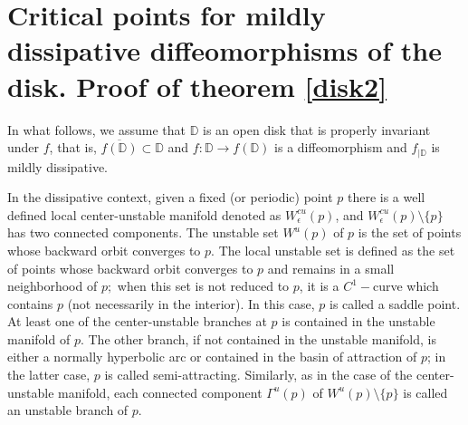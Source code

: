 \documentclass[a4paper,11pt]{article}
\newtheorem{proposition}[lemma]{Proposition}
\theoremstyle{definition}
\def\DD{{\mathbb D}}
\def\NN{{\mathbb N}}
\def\e{\epsilon}
\def\Ga{\Gamma}
\def\Ga{\Gamma}
\begin{document}









\section{Critical points for  mildly dissipative diffeomorphisms of the disk. Proof of theorem \ref{disk2}}\label{sec:disk}



In what follows, we assume that $\DD$ is an open disk that is properly invariant under $f$, that is, $\overline{f(\DD)}\subset \DD$ and $f: \DD\to f(\DD)$ is a diffeomorphism and $f_{|\DD}$ is mildly dissipative.

In the dissipative context, given a fixed (or periodic) point $p$  there is  a well defined local center-unstable manifold denoted as $W^{cu}_\e(p)$, and   $W^{cu}_\e(p)\setminus\{p\}$ has two connected components.  The unstable set $W^u(p)$ of $p$ is the set of points whose backward orbit
converges to $p$. The local unstable set is defined as the set of points whose backward orbit
converges to $p$ and remains in a small neighborhood of $p;$  when this set is not reduced to $p$, it is a $C^1-$curve which
contains $p$ (not necessarily in the interior). In this case, $p$ is called a saddle point. At least one of the center-unstable branches at $p$ is contained in the unstable manifold of $
p$. The other branch, if not contained in the unstable manifold, is either a normally hyperbolic arc or contained in the basin of attraction of $p$; in the latter case, $p$ is called semi-attracting.  Similarly, as  in the case of the center-unstable manifold, each connected component $\Ga^u(p)$ of $W^u(p)\setminus\{p\}$ is called an unstable branch of  $p$. 
\end{document}
